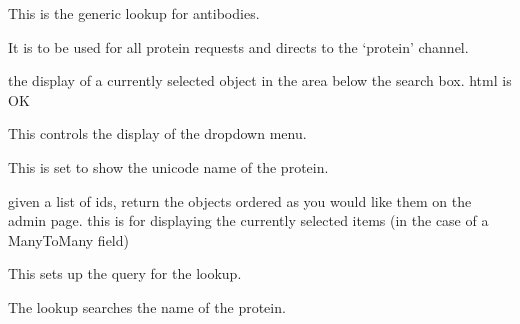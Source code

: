 \documentclass[letterpaper,10pt,english]{sphinxmanual}
\begin{document}
\begin{fulllineitems}
\label{api:experimentdb.proteins.lookups.ProteinLookup}
This is the generic lookup for antibodies.


It is to be used for all protein requests and directs to the `protein' channel.


\begin{fulllineitems}
\label{api:experimentdb.proteins.lookups.ProteinLookup.format_item}
the display of a currently selected object in the area below the search box. html is OK


\end{fulllineitems}


\begin{fulllineitems}
\label{api:experimentdb.proteins.lookups.ProteinLookup.format_result}
This controls the display of the dropdown menu.


This is set to show the unicode name of the protein.


\end{fulllineitems}


\begin{fulllineitems}
\label{api:experimentdb.proteins.lookups.ProteinLookup.get_objects}
given a list of ids, return the objects ordered as you would like them on the admin page.
this is for displaying the currently selected items (in the case of a ManyToMany field)


\end{fulllineitems}


\begin{fulllineitems}
\label{api:experimentdb.proteins.lookups.ProteinLookup.get_query}
This sets up the query for the lookup.


The lookup searches the name of the protein.


\end{fulllineitems}


\end{fulllineitems}
\end{document}
